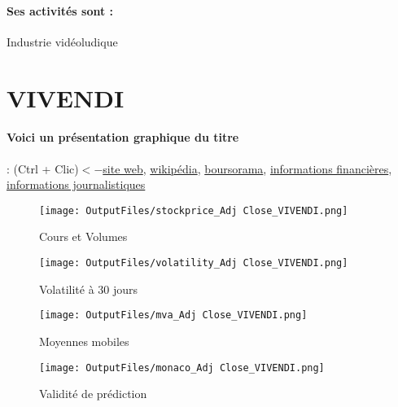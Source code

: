\documentclass[11pt,a4paper]{report}%
\begin{document}
\paragraph{Ses activités sont : } Industrie vidéoludique 
    
    \newpage

\section{VIVENDI}

\paragraph{Voici un présentation graphique du titre} : (Ctrl + Clic)$<-$\href{https://www.vivendi.com/actionnaires-investisseurs/essentiel-actionnaires-investisseurs/}{site web}, \href{https://fr.wikipedia.org/wiki/Vivendi}{wikipédia}, \href{https://www.boursorama.com/cours/1rPVIV}{boursorama}, \href{https://www.qwant.com/?q=site:https:%2f%2fwww.easybourse.com%2faction-societe%2fVIVENDI&t=web&client=ext-firefox-hp}{informations financières}, \href{https://bourse.lerevenu.com/cours-de-bourse/fiche-valeur-synthese/VIVENDI/VIV-FR}{informations journalistiques}
\begin{figure}[!htb]
   \begin{minipage}{0.5\textwidth}
     \centering
     \texttt{[image: OutputFiles/stockprice\_Adj Close\_VIVENDI.png]}
     \caption{Cours et Volumes}\label{Fig:price_VIVENDI}
   \end{minipage}\hfill
   \begin{minipage}{0.5\textwidth}
     \centering
     \texttt{[image: OutputFiles/volatility\_Adj Close\_VIVENDI.png]}
     \caption{Volatilité à 30 jours}\label{Fig:volat_VIVENDI}
   \end{minipage}
\end{figure}
\begin{figure}[!htb]
   \begin{minipage}{0.5\textwidth}
     \centering
     \texttt{[image: OutputFiles/mva\_Adj Close\_VIVENDI.png]}
     \caption{Moyennes mobiles}\label{Fig:mva_VIVENDI}
   \end{minipage}\hfill
   \begin{minipage}{0.5\textwidth}
     \centering
     \texttt{[image: OutputFiles/monaco\_Adj Close\_VIVENDI.png]}
     \caption{Validité de prédiction}\label{Fig:prediction_VIVENDI}
   \end{minipage}
\end{figure}
\end{document}
